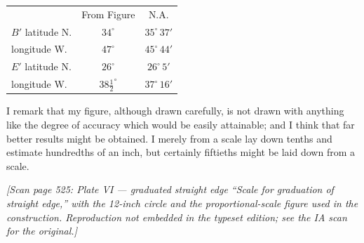 \documentclass[11pt]{article}
\begin{document}
\begin{center}
\begin{tabular}{lcc}
 & From Figure & N.A. \\
$B'$ latitude N. & $34^{\circ}$ & $35^{\circ}\,37'$\\
\phantom{$B'$} longitude W. & $47^{\circ}$ & $45^{\circ}\,44'$\\
$E'$ latitude N. & $26^{\circ}$ & $26^{\circ}\,5'$\\
\phantom{$E'$} longitude W. & $38\tfrac{1}{2}^{\circ}$ & $37^{\circ}\,16'$\\
\end{tabular}
\end{center}

\medskip

I remark that my figure, although drawn carefully, is not drawn with
anything like the degree of accuracy which would be easily attainable;
and I think that far better results might be obtained. I merely from a
scale lay down tenths and estimate hundredths of an inch, but certainly
fiftieths might be laid down from a scale.

\bigskip

\begin{center}
\textit{[Scan page 525: Plate VI --- graduated straight edge ``Scale for
graduation of straight edge,'' with the 12-inch circle and the
proportional-scale figure used in the construction. Reproduction not
embedded in the typeset edition; see the IA scan for the original.]}
\end{center}
\end{document}
